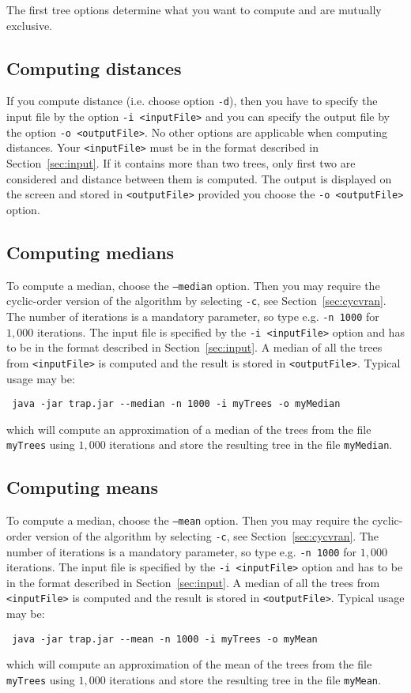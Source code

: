 \documentclass[a4paper,12pt]{amsart}
\begin{document}
\vspace{12pt}

The first tree options determine what you want to compute and are mutually exclusive. 

\subsection{Computing distances}
If you compute distance (i.e. choose option \texttt{-d}), then you have to specify the input file by the option \texttt{-i <inputFile>} and you can specify the output file by the option \texttt{-o <outputFile>}. No other options are applicable when computing distances. Your \texttt{<inputFile>} must be in the format described in Section~\ref{sec:input}. If it contains more than two trees, only first two are considered and distance between them is computed. The output is displayed on the screen and stored in \texttt{<outputFile>} provided you choose the \texttt{-o <outputFile>} option.

\subsection{Computing medians}
To compute a median, choose the \texttt{--median} option. Then you may require the cyclic-order version of the algorithm by selecting \texttt{-c}, see Section~\ref{sec:cycvran}. The number of iterations is a mandatory parameter, so type e.g. \texttt{-n 1000} for $1,000$ iterations. The input file is specified by the \texttt{-i <inputFile>} option and has to be in the format described in Section~\ref{sec:input}. A median of all the trees from \texttt{<inputFile>} is computed and the result is stored in \texttt{<outputFile>}. Typical usage may be:
\begin{verbatim}
 java -jar trap.jar --median -n 1000 -i myTrees -o myMedian
\end{verbatim}
which will compute an approximation of a median of the trees from the file \texttt{myTrees} using $1,000$ iterations and store the resulting tree in the file \texttt{myMedian}.


\subsection{Computing means}
To compute a median, choose the \texttt{--mean} option. Then you may require the cyclic-order version of the algorithm by selecting \texttt{-c}, see Section~\ref{sec:cycvran}. The number of iterations is a mandatory parameter, so type e.g. \texttt{-n 1000} for $1,000$ iterations. The input file is specified by the \texttt{-i <inputFile>} option and has to be in the format described in Section~\ref{sec:input}. A median of all the trees from \texttt{<inputFile>} is computed and the result is stored in \texttt{<outputFile>}. Typical usage may be:
\begin{verbatim}
 java -jar trap.jar --mean -n 1000 -i myTrees -o myMean
\end{verbatim}
which will compute an approximation of the mean of the trees from the file \texttt{myTrees} using $1,000$ iterations and store the resulting tree in the file \texttt{myMean}.
\end{document}
